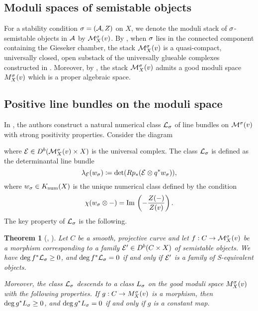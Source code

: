 \documentclass[letterpaper,12pt]{amsart}
\newtheorem{thm}{Theorem}[section]
\theoremstyle{remark}
\begin{document}
\subsection{Moduli spaces of semistable objects}
For a stability condition $\sigma = (\mathcal{A}, Z)$ on $X$, we denote the moduli stack of $\sigma$-semistable objects in $\mathcal{A}$ by $\mathcal{M}^\sigma_X(v)$. By \cite{toda08}, when $\sigma$ lies in the connected component containing the Gieseker chamber, the stack $\mathcal{M}^\sigma_X(v)$ is a quasi-compact, universally closed, open substack of the universally glueable complexes constructed in \cite{lie06}. Moreover, by \cite[Theorem 7.25]{AHLH}, the stack $\mathcal{M}^\sigma_X(v)$ admits a good moduli space $M^\sigma_X(v)$ which is a proper algebraic space.

\subsection{Positive line bundles on the moduli space}
In \cite{BM}, the authors construct a natural numerical class $\mathcal{L}_\sigma$ of line bundles on $\mathcal{M}^\sigma(v)$ with strong positivity properties. Consider the diagram
\begin{center}
\end{center}
where $\mathcal{E} \in D^b(\mathcal{M}^\sigma_X(v) \times X)$ is the universal complex. The class $\mathcal{L}_\sigma$ is defined as the determinantal line bundle
\[ \lambda_{\mathcal{E}}(w_\sigma) \coloneqq \det(R p_*( \mathcal{E} \otimes q^* w_\sigma)), \]
where $w_\sigma \in K_{\mathrm{num}}(X)$ is the unique numerical class defined by the condition
\[ \chi(w_\sigma \otimes - ) = \mathrm{Im}\,\left(- \frac{Z(-)}{Z(v)}\right). \]
The key property of $\mathcal{L}_\sigma$ is the following.
\begin{thm}[{\cite[Lemma 3.3]{BM}, \cite[Lemma 5.3]{t}}]
    Let $C$ be a smooth, projective curve and let $f: C \to \mathcal{M}^\sigma_X(v)$ be a morphism corresponding to a family $\mathcal{E}' \in D^b(C \times X)$ of semistable objects. We have $\deg f^* \mathcal{L}_\sigma \ge 0$, and $\deg f^* \mathcal{L}_\sigma = 0$ if and only if $\mathcal{E}'$ is a family of S-equivalent objects.
    
    Moreover, the class $\mathcal{L}_\sigma$ descends to a class $L_\sigma$ on the good moduli space $M^\sigma_X(v)$ with the following properties. If $g: C \to M^\sigma_X(v)$ is a morphism, then $\deg g^*L_\sigma \ge 0$, and $\deg g^* L_\sigma = 0$ if and only if $g$ is a constant map.
\end{thm}
\end{document}
